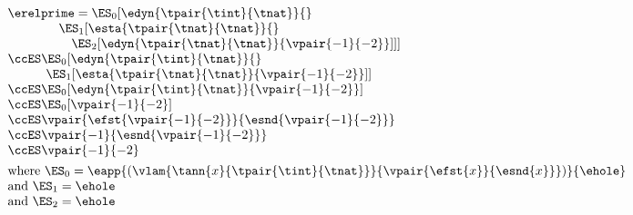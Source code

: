 $\begin{array}{l}
  \erelprime = \ES_0[\edyn{\tpair{\tint}{\tnat}}{}
\\\qquad\quad\quad \ES_1[\esta{\tpair{\tnat}{\tnat}}{}
\\\qquad\quad\quad\quad \ES_2[\edyn{\tpair{\tnat}{\tnat}}{\vpair{-1}{-2}}]]]
\\\ccES \ES_0[\edyn{\tpair{\tint}{\tnat}}{}
\\\qquad\quad \ES_1[\esta{\tpair{\tnat}{\tnat}}{\vpair{-1}{-2}}]]
\\\ccES \ES_0[\edyn{\tpair{\tint}{\tnat}}{\vpair{-1}{-2}}]
\\\ccES \ES_0[\vpair{-1}{-2}]
\\\ccES \vpair{\efst{\vpair{-1}{-2}}}{\esnd{\vpair{-1}{-2}}}
\\\ccES \vpair{-1}{\esnd{\vpair{-1}{-2}}}
\\\ccES \vpair{-1}{-2}
\\[1ex]
  \mbox{where } \ES_0 = \eapp{(\vlam{\tann{x}{\tpair{\tint}{\tnat}}}{\vpair{\efst{x}}{\esnd{x}}})}{\ehole}
\\\mbox{and } \ES_1 = \ehole
\\\mbox{and } \ES_2 = \ehole
\end{array}$
